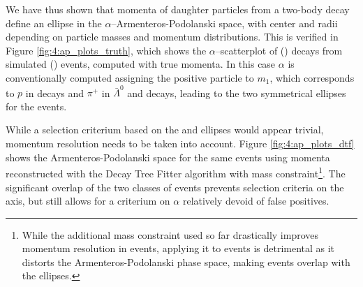 We have thus shown that momenta of daughter particles from a two-body decay define an ellipse in the $\alpha$--\pt Armenteros-Podolanski space, with center and radii depending on particle masses and momentum distributions.
This is verified in Figure \ref{fig:4:ap_plots_truth}, which shows the $\alpha$--\pt scatterplot of \lambdadecay (\kshortdecay) decays from simulated \demonstratorshort (\physbkgshort) events, computed with true momenta.
In this case $\alpha$ is conventionally computed assigning the positive particle to $m_1$, which corresponds to $p$ in \lz decays and $\pi^+$ in $\bar{\Lambda}^0$ and \kshort decays, leading to the two symmetrical ellipses for the \demonstratorshort events.

While a selection criterium based on the \kshort and \lz ellipses would appear trivial, momentum resolution needs to be taken into account.
Figure \ref{fig:4:ap_plots_dtf} shows the Armenteros-Podolanski space for the same events using momenta reconstructed with the Decay Tree Fitter algorithm with \jpsi mass constraint\footnote{While the additional \lz mass constraint used so far drastically improves momentum resolution in \demonstratorshort events, applying it to \physbkgshort events is detrimental as it distorts the Armenteros-Podolanski phase space, making \kshortdecay events overlap with the \lambdadecay ellipses.}.
The significant overlap of the two classes of events prevents selection criteria on the \pt axis, but still allows for a criterium on $\alpha$ relatively devoid of false positives.

